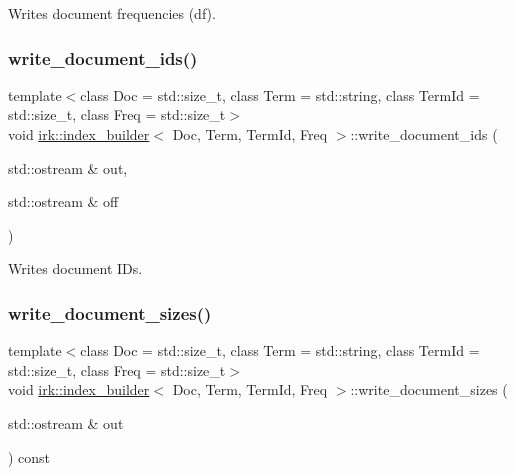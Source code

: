 Writes document frequencies (df). 

\mbox{\label{classirk_1_1index__builder_adcb91466aff37e3fe77b400bffdadfbe}} 
\subsubsection{\texorpdfstring{write\+\_\+document\+\_\+ids()}{write\_document\_ids()}}
{\footnotesize\ttfamily template$<$class Doc  = std\+::size\+\_\+t, class Term  = std\+::string, class Term\+Id  = std\+::size\+\_\+t, class Freq  = std\+::size\+\_\+t$>$ \\
void \mbox{\hyperlink{classirk_1_1index__builder}{irk\+::index\+\_\+builder}}$<$ Doc, Term, Term\+Id, Freq $>$\+::write\+\_\+document\+\_\+ids (\begin{DoxyParamCaption}\item[{std\+::ostream \&}]{out,  }\item[{std\+::ostream \&}]{off }\end{DoxyParamCaption})\hspace{0.3cm}{\ttfamily [inline]}}



Writes document I\+Ds. 

\mbox{\label{classirk_1_1index__builder_a734a12d7e31414de11758e18c24010b2}} 
\subsubsection{\texorpdfstring{write\+\_\+document\+\_\+sizes()}{write\_document\_sizes()}}
{\footnotesize\ttfamily template$<$class Doc  = std\+::size\+\_\+t, class Term  = std\+::string, class Term\+Id  = std\+::size\+\_\+t, class Freq  = std\+::size\+\_\+t$>$ \\
void \mbox{\hyperlink{classirk_1_1index__builder}{irk\+::index\+\_\+builder}}$<$ Doc, Term, Term\+Id, Freq $>$\+::write\+\_\+document\+\_\+sizes (\begin{DoxyParamCaption}\item[{std\+::ostream \&}]{out }\end{DoxyParamCaption}) const\hspace{0.3cm}{\ttfamily [inline]}}



